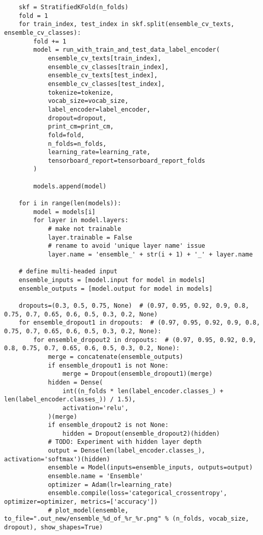 \begin{verbatim}
    skf = StratifiedKFold(n_folds)
    fold = 1
    for train_index, test_index in skf.split(ensemble_cv_texts, ensemble_cv_classes):
        fold += 1
        model = run_with_train_and_test_data_label_encoder(
            ensemble_cv_texts[train_index],
            ensemble_cv_classes[train_index],
            ensemble_cv_texts[test_index],
            ensemble_cv_classes[test_index],
            tokenize=tokenize,
            vocab_size=vocab_size,
            label_encoder=label_encoder,
            dropout=dropout,
            print_cm=print_cm,
            fold=fold,
            n_folds=n_folds,
            learning_rate=learning_rate,
            tensorboard_report=tensorboard_report_folds
        )

        models.append(model)

    for i in range(len(models)):
        model = models[i]
        for layer in model.layers:
            # make not trainable
            layer.trainable = False
            # rename to avoid 'unique layer name' issue
            layer.name = 'ensemble_' + str(i + 1) + '_' + layer.name

    # define multi-headed input
    ensemble_inputs = [model.input for model in models]
    ensemble_outputs = [model.output for model in models]

    dropouts=(0.3, 0.5, 0.75, None)  # (0.97, 0.95, 0.92, 0.9, 0.8, 0.75, 0.7, 0.65, 0.6, 0.5, 0.3, 0.2, None)
    for ensemble_dropout1 in dropouts:  # (0.97, 0.95, 0.92, 0.9, 0.8, 0.75, 0.7, 0.65, 0.6, 0.5, 0.3, 0.2, None):
        for ensemble_dropout2 in dropouts:  # (0.97, 0.95, 0.92, 0.9, 0.8, 0.75, 0.7, 0.65, 0.6, 0.5, 0.3, 0.2, None):
            merge = concatenate(ensemble_outputs)
            if ensemble_dropout1 is not None:
                merge = Dropout(ensemble_dropout1)(merge)
            hidden = Dense(
                int((n_folds * len(label_encoder.classes_) + len(label_encoder.classes_)) / 1.5),
                activation='relu',
            )(merge)
            if ensemble_dropout2 is not None:
                hidden = Dropout(ensemble_dropout2)(hidden)
            # TODO: Experiment with hidden layer depth
            output = Dense(len(label_encoder.classes_), activation='softmax')(hidden)
            ensemble = Model(inputs=ensemble_inputs, outputs=output)
            ensemble.name = 'Ensemble'
            optimizer = Adam(lr=learning_rate)
            ensemble.compile(loss='categorical_crossentropy', optimizer=optimizer, metrics=['accuracy'])
            # plot_model(ensemble, to_file=".out_new/ensemble_%d_of_%r_%r.png" % (n_folds, vocab_size, dropout), show_shapes=True)


\end{verbatim}
